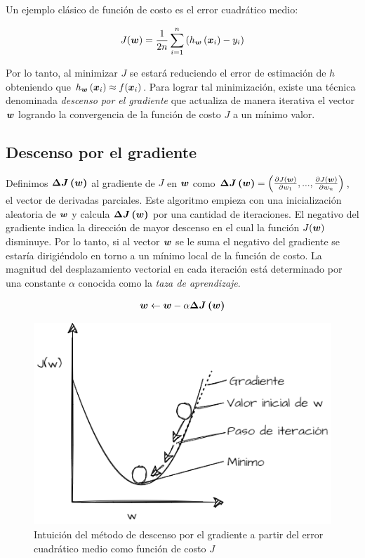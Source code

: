 Un ejemplo clásico de función de costo es el error cuadrático medio:

\begin{align}
    J(\boldsymbol{w}) = \frac{1}{2n} \sum_{i=1}^{n}\left( h_{\boldsymbol{w}}\left( \boldsymbol{x}_{i}\right) - y_i \right)
\end{align}

Por lo tanto, al minimizar $J$ se estará reduciendo el error de estimación de
$h$ obteniendo que $h_{\boldsymbol{w}}\left( \boldsymbol{x}_{i} \right) \approx
f(\boldsymbol{x}_{i})$. Para lograr tal minimización, existe una técnica denominada
\emph{descenso por el gradiente} que actualiza de manera iterativa el
vector $\boldsymbol{w}$ logrando la convergencia de la función de costo $J$ a un
mínimo valor.

\subsection{Descenso por el gradiente}

Definimos $\boldsymbol{\Delta J\left( w \right)}$ al gradiente de $J$ en $\boldsymbol{w}$
como $\boldsymbol{\Delta J\left( \boldsymbol{w} \right)} = \left(\frac{\partial
J(\boldsymbol{w})}{\partial w_1}, ..., \frac{\partial J(\boldsymbol{w})}{\partial w_n}
\right)$, el vector de derivadas parciales. Este algoritmo empieza con una
inicialización aleatoria de $\boldsymbol{w}$ y calcula $\boldsymbol{\Delta J\left( w
\right)}$ por una cantidad de iteraciones. El negativo del gradiente indica la
dirección de mayor descenso en el cual la función $J(\boldsymbol{w})$ disminuye. Por
lo tanto, si al vector $\boldsymbol{w}$ se le suma el negativo del gradiente se estaría
dirigiéndolo en torno a un mínimo local de la función de costo. La magnitud del
desplazamiento vectorial en cada iteración está determinado por una constante
$\alpha$ conocida como la \emph{taza de aprendizaje}.

\begin{align} \label{eq:gradient_descent}
    \boldsymbol{w} \leftarrow \boldsymbol{w} - \alpha \boldsymbol{\Delta J\left( w \right)}
\end{align}

\begin{figure}
    \centering
    \includegraphics[scale=0.5]{figures/gradient_descent_plot.png}
    \caption{Intuición del método de descenso por el gradiente a partir del error cuadrático medio como función de costo $J$}
    \label{fig:gradient_descent}
\end{figure}

